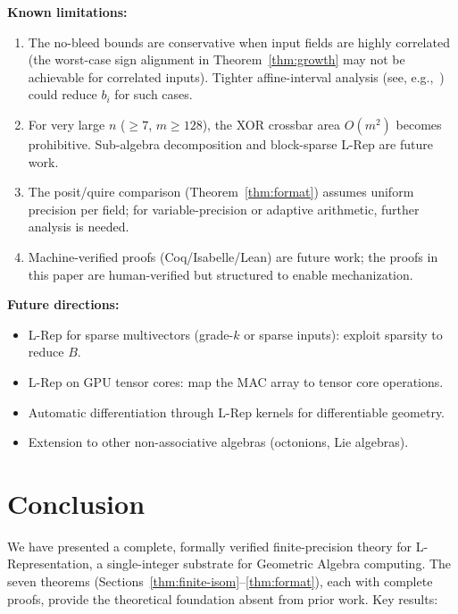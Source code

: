 \documentclass[11pt,a4paper]{article}
\theoremstyle{definition}
\theoremstyle{plain}
\theoremstyle{remark}
\begin{document}
\textbf{Known limitations:}
\begin{enumerate}
  \item The no-bleed bounds are conservative when input fields are highly correlated (the worst-case sign alignment in Theorem~\ref{thm:growth} may not be achievable for correlated inputs).  Tighter affine-interval analysis (see, e.g.,~\cite{rump1999}) could reduce $b_i$ for such cases.
  \item For very large $n$ ($\ge 7$, $m\ge 128$), the XOR crossbar area $O(m^2)$ becomes prohibitive.  Sub-algebra decomposition and block-sparse L-Rep are future work.
  \item The posit/quire comparison (Theorem~\ref{thm:format}) assumes uniform precision per field; for variable-precision or adaptive arithmetic, further analysis is needed.
  \item Machine-verified proofs (Coq/Isabelle/Lean) are future work; the proofs in this paper are human-verified but structured to enable mechanization.
\end{enumerate}

\textbf{Future directions:}
\begin{itemize}
  \item L-Rep for sparse multivectors (grade-$k$ or sparse inputs): exploit sparsity to reduce $B$.
  \item L-Rep on GPU tensor cores: map the MAC array to tensor core operations.
  \item Automatic differentiation through L-Rep kernels for differentiable geometry.
  \item Extension to other non-associative algebras (octonions, Lie algebras).
\end{itemize}

\section{Conclusion}
\label{sec:conclusion}

We have presented a complete, formally verified finite-precision theory for L-Representation, a single-integer substrate for Geometric Algebra computing. The seven theorems (Sections~\ref{thm:finite-isom}--\ref{thm:format}), each with complete proofs, provide the theoretical foundation absent from prior work.  Key results:
\end{document}
